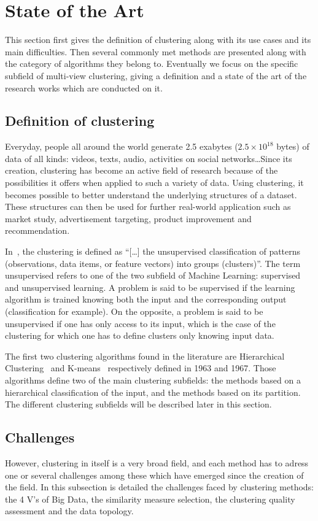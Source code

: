 \documentclass[a4paper]{report}
\begin{document}
\chapter{State of the Art}
This section first gives the definition of clustering along with its use cases and its main difficulties. Then several commonly met methods are presented along with the category of algorithms they belong to. Eventually we focus on the specific subfield of multi-view clustering, giving a definition and a state of the art of the research works which are conducted on it.

    \section{Definition of clustering}
    Everyday, people all around the world generate 2.5 exabytes ($2.5 \times 10^{18}$ bytes) of data of all kinds: videos, texts, audio, activities on social networks\ldots Since its creation, clustering has become an active field of research because of the possibilities it offers when applied to such a variety of data. Using clustering, it becomes possible to better understand the underlying structures of a dataset. These structures can then be used for further real-world application such as market study, advertisement targeting, product improvement and recommendation.

    In~\cite{jain1999data}, the clustering is defined as ``[\ldots] the unsupervised classification of patterns (observations, data items, or feature vectors) into groups (clusters)''. The term unsupervised refers to one of the two subfield of Machine Learning: supervised and unsupervised learning. A problem is said to be supervised if the learning algorithm is trained knowing both the input and the corresponding output (classification for example). On the opposite, a problem is said to be unsupervised if one has only access to its input, which is the case of the clustering for which one has to define clusters only knowing input data.  

    The first two clustering algorithms found in the literature are Hierarchical Clustering~\cite{ward1963hierarchical} and K-means~\cite{macqueen1967some} respectively defined in 1963 and 1967. Those algorithms define two of the main clustering subfields: the methods based on a hierarchical classification of the input, and the methods based on its partition. The different clustering subfields will be described later in this section.

    \section{Challenges}
    However, clustering in itself is a very broad field, and each method has to adress one or several challenges among these which have emerged since the creation of the field. In this subsection is detailed the challenges faced by clustering methods: the 4 V's of Big Data, the similarity measure selection, the clustering quality assessment and the data topology.
    
\end{document}
